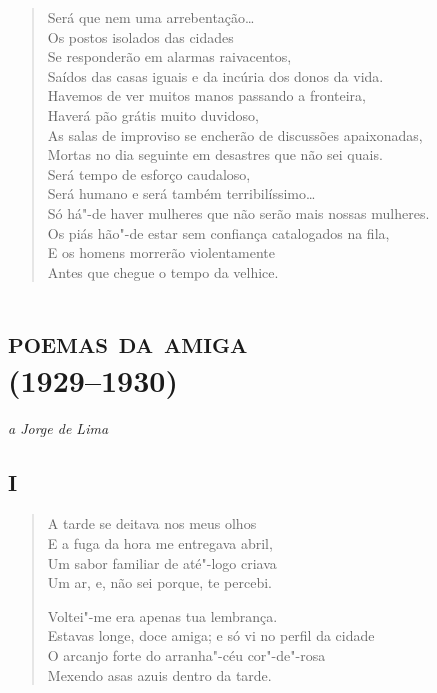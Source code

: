 \begin{verse}
Será que nem uma arrebentação\ldots{}\\
Os postos isolados das cidades\\
Se responderão em alarmas raivacentos,\\
Saídos das casas iguais e da incúria dos donos da vida.\\
Havemos de ver muitos manos passando a fronteira,\\
Haverá pão grátis muito duvidoso,\\
As salas de improviso se encherão de discussões apaixonadas,\\
Mortas no dia seguinte em desastres que não sei quais.\\
Será tempo de esforço caudaloso,\\
Será humano e será também terribilíssimo\ldots{}\\
Só há"-de haver mulheres que não serão mais nossas mulheres.\\
Os piás hão"-de estar sem confiança catalogados na fila,\\
E os homens morrerão violentamente\\
Antes que chegue o tempo da velhice.
\end{verse}

\chapter[\textsc{poemas da amiga}\\I -- ``A tarde se deitava nos meus olhos'']{\textsc{poemas da amiga}\\(1929--1930)}

\begin{flushright}
\emph{a Jorge de Lima}
\end{flushright}

\section*{I}

\begin{verse}
A tarde se deitava nos meus olhos\\
E a fuga da hora me entregava abril,\\
Um sabor familiar de até"-logo criava\\
Um ar, e, não sei porque, te percebi.

Voltei"-me era apenas tua lembrança.\\
Estavas longe, doce amiga; e só vi no perfil da cidade\\
O arcanjo forte do arranha"-céu cor"-de"-rosa\\
Mexendo asas azuis dentro da tarde.
\end{verse}


